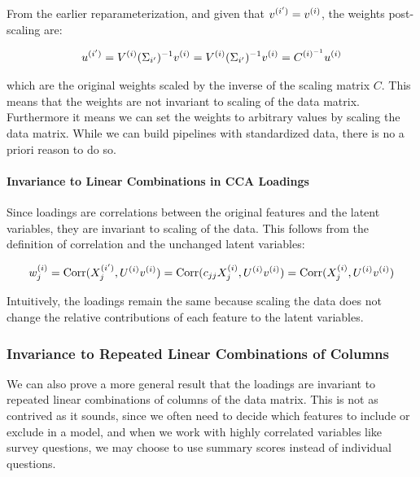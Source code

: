 From the earlier reparameterization, and given that $v^{(i')}=v^{(i)}$, the weights post-scaling are:

\begin{align}
    u^{(i')} = V^{(i)}(\Sigma_{i'})^{-1}v^{(i)} = V^{(i)}(\Sigma_{i'})^{-1}v^{(i)} = C^{{(i)}^{-1}}u^{(i)} \label{eq:weights_change2}
\end{align}

which are the original weights scaled by the inverse of the scaling matrix \( C \). This means that the weights are not invariant to scaling of the data matrix. Furthermore it means we can set the weights to arbitrary values by scaling the data matrix.
While we can build pipelines with standardized data, there is no a priori reason to do so.

\paragraph{Invariance to Linear Combinations in CCA Loadings}

Since \gls{loadings} are correlations between the original features and the latent variables, they are invariant to scaling of the data.
This follows from the definition of correlation and the unchanged latent variables:

\begin{align}
    w^{(i)}_j = \operatorname{Corr}(X^{(i')}_j, U^{(i)}v^{(i)}) = \operatorname{Corr}(c_{jj}X^{(i)}_j, U^{(i)}v^{(i)}) = \operatorname{Corr}(X^{(i)}_j, U^{(i)}v^{(i)}) \label{eq:loading_invariant}
\end{align}

Intuitively, the \gls{loadings} remain the same because scaling the data does not change the relative contributions of each feature to the latent variables.

\subsubsection{Invariance to Repeated Linear Combinations of Columns}\label{subsubsec:invariance-to-linear-combinations}

We can also prove a more general result that the \gls{loadings} are invariant to repeated linear combinations of columns of the data matrix.
This is not as contrived as it sounds, since we often need to decide which features to include or exclude in a model, and when we work with highly correlated variables like survey questions, we may choose to use summary scores instead of individual questions.

